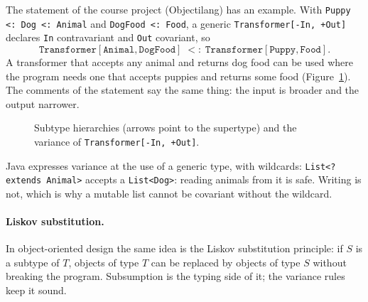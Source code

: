 The statement of the course project (Objectilang) has an example. With
\texttt{Puppy <: Dog <: Animal} and \texttt{DogFood <: Food}, a generic
\texttt{Transformer[-In, +Out]} declares \texttt{In} contravariant and
\texttt{Out} covariant, so
\[
\mathtt{Transformer[Animal, DogFood]} \;<:\; \mathtt{Transformer[Puppy, Food]}.
\]
A transformer that accepts any animal and returns dog food can be used where
the program needs one that accepts puppies and returns some food
(Figure~\ref{fig:variance}). The comments of the statement say the same thing:
the input is broader and the output narrower.

\begin{figure}[h]
\centering
{}
\caption{Subtype hierarchies (arrows point to the supertype) and the variance of \texttt{Transformer[-In, +Out]}.}
\label{fig:variance}
\end{figure}

Java expresses variance at the use of a generic type, with wildcards:
\texttt{List<? extends Animal>} accepts a \texttt{List<Dog>}: reading animals
from it is safe. Writing is not, which is why a mutable list cannot be
covariant without the wildcard.

\paragraph{Liskov substitution.} In object-oriented design the same idea is the
Liskov substitution principle: if $S$ is a subtype of $T$, objects of type $T$
can be replaced by objects of type $S$ without breaking the program.
Subsumption is the typing side of it; the variance rules keep it sound.

